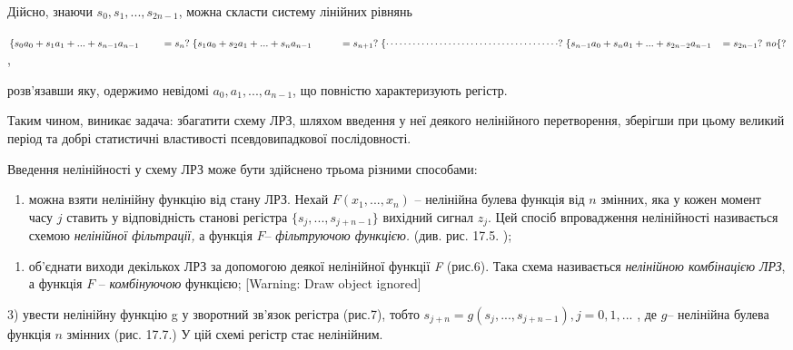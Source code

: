\documentclass[a4paper]{article}
\newcounter{saveenum}
\newcommand\liststyleWWviiiNumxlvii{%
\renewcommand\theenumi{\arabic{enumi}}
\renewcommand\theenumii{\arabic{enumii}}
\renewcommand\theenumiii{\arabic{enumiii}}
\renewcommand\theenumiv{\arabic{enumiv}}
\renewcommand\labelenumi{\theenumi)}
\renewcommand\labelenumii{\theenumii.}
\renewcommand\labelenumiii{\theenumiii.}
\renewcommand\labelenumiv{\theenumiv.}
}
\newcounter{}
\begin{document}
Дійсно, знаючи  ${s_{{0}},s_{{1}},\text{.}\text{.}\text{.},s_{{2n-1}}}$, можна
скласти систему лінійних рівнянь


\bigskip

{\centering

${\begin{matrix}\left\{s_{{0}}a_{{0}}+s_{{1}}a_{{1}}+\text{.}\text{.}\text{.}+s_{{n-1}}a_{{n-1}}\;\;\;\;\;\;\;\;=s_{{n}}?\right.\left\{s_{{1}}a_{{0}}+s_{{2}}a_{{1}}+\text{.}\text{.}\text{.}+s_{{n}}a_{{n-1}}\;\;\;\;\;\;\;\;\;\;=s_{{n+1}}?\right.\left\{\cdots
\cdots \cdots \cdots \cdots \cdots \cdots \cdots \cdots \cdots \cdots \cdots
\cdots
?\right.\left\{s_{{n-1}}a_{{0}}+s_{{n}}a_{{1}}+\text{.}\text{.}\text{.}+s_{{2n-2}}a_{{n-1}}\;\;\;=s_{{2n-1}}?\right.\mathit{no}\hfill\null
\end{matrix}\{?}$,
\par}


\bigskip

розв’язавши яку, одержимо невідомі 
${a_{{0}},a_{{1}},\text{.}\text{.}\text{.},a_{{n-1}}}$, що повністю
характеризують регістр.

Таким чином, виникає задача: збагатити схему ЛРЗ, шляхом введення у неї деякого
нелінійного перетворення, зберігши при цьому великий період та добрі
статистичні властивості псевдовипадкової послідовності.

Введення нелінійності у схему ЛРЗ може бути здійснено трьома різними способами:

\liststyleWWviiiNumxlvii
\begin{enumerate}
\item можна взяти нелінійну функцію від стану ЛРЗ. Нехай 
${F(x_{{1}},\text{.}\text{.}\text{.},x_{{n}})}$ – нелінійна булева функція від 
${n}$ змінних, яка у кожен момент часу  ${j}$ ставить у відповідність станові
регістра  ${\{s_{{j}},\text{.}\text{.}\text{.},s_{{j+n-1}}\}}$ вихідний сигнал 
${z_{{j}}}$. Цей спосіб впровадження нелінійності називається схемою
\textit{нелінійної фільтрації, }а функція  ${F}$–  \textit{фільтруючою
функцією. }(див. рис.\textcolor{red}{ }17.5. );
\end{enumerate}

\bigskip

{\par}


\bigskip


\bigskip

\liststyleWWviiiNumxlvii
\setcounter{saveenum}{\value{enumi}}
\begin{enumerate}
\setcounter{enumi}{\value{saveenum}}
\item об’єднати виходи декількох ЛРЗ за допомогою деякої нелінійної функції
\textit{F} (рис.6). Така схема називається \textit{нелінійною комбінацією ЛРЗ},
а функція  ${F}$ – \textit{комбінуючою }функцією; [Warning: Draw object
ignored]
\end{enumerate}
3)  увести нелінійну функцію g у зворотний зв’язок регістра (рис.7), тобто 
${s_{{j+n}}=g(s_{{j}},\text{.}\text{.}\text{.},s_{{j+n-1}}),j=0,1,\text{.}\text{.}\text{.}}$
, де  ${g}$– нелінійна булева функція  ${n}$ змінних (рис. 17.7.)  У цій схемі 
регістр стає нелінійним. 
\end{document}
